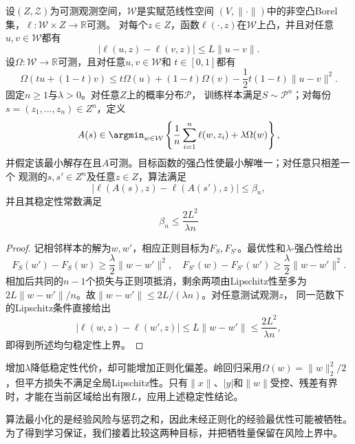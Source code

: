 \begin{theorem}[强凸正则化的稳定性]
\label{thm:regularized-erm-stability}
设$(Z,\mathcal Z)$为可测观测空间，$\mathcal W$是实赋范线性空间
$(V,\|\cdot\|)$中的非空凸Borel集，$\ell:\mathcal W\times Z\to\mathbb R$可测。
对每个$z\in Z$，函数$\ell(\cdot,z)$在$\mathcal W$上凸，并且对任意
$u,v\in\mathcal W$都有
\[
 |\ell(u,z)-\ell(v,z)|\leq L\|u-v\|.
\]
设$\Omega:\mathcal W\to\mathbb R$可测，且对任意$u,v\in\mathcal W$和
$t\in[0,1]$都有
\[
 \Omega(tu+(1-t)v)
 \leq t\Omega(u)+(1-t)\Omega(v)-\frac12t(1-t)\|u-v\|^2.
\]
固定$n\geq1$与$\lambda>0$。对任意$Z$上的概率分布$\mathcal P$，
训练样本满足$S\sim\mathcal P^n$；对每份$s=(z_1,\ldots,z_n)\in Z^n$，定义
\[
 A(s)\in\argmin_{w\in\mathcal W}
 \left\{\frac1n\sum_{i=1}^n\ell(w,z_i)+\lambda\Omega(w)\right\},
\]
并假定该最小解存在且$A$可测。目标函数的强凸性使最小解唯一；对任意只相差一个
观测的$s,s'\in Z^n$及任意$z\in Z$，算法满足
\[
 |\ell(A(s),z)-\ell(A(s'),z)|\leq\beta_n,
\]
并且其稳定性常数满足
\begin{equation}
 \beta_n\leq\frac{2L^2}{\lambda n}
 \label{eq:regularized-stability-bound}
\end{equation}
\end{theorem}

\begin{proof}
记相邻样本的解为$w,w'$，相应正则目标为$F_S,F_{S'}$。最优性和$\lambda$-强凸性给出
\begin{equation*}
 F_S(w')-F_S(w)\geq\frac\lambda2\|w-w'\|^2,
 \quad
 F_{S'}(w)-F_{S'}(w')\geq\frac\lambda2\|w-w'\|^2.
\end{equation*}
相加后共同的$n-1$个损失与正则项抵消，剩余两项由Lipschitz性至多为
$2L\|w-w'\|/n$。故$\|w-w'\|\leq2L/(\lambda n)$。对任意测试观测$z$，
同一范数下的Lipschitz条件直接给出
\[
 |\ell(w,z)-\ell(w',z)|
 \leq L\|w-w'\|
 \leq\frac{2L^2}{\lambda n},
\]
即得到所述均匀稳定性上界。
\end{proof}

增加$\lambda$降低稳定性代价，却可能增加正则化偏差。岭回归采用$\Omega(w)=\|w\|_2^2/2$，但平方损失不满足全局Lipschitz性。只有$\|x\|$、$|y|$和$\|w\|$受控、残差有界时，才能在当前区域给出有限$L$，应用上述稳定性结论。

算法最小化的是经验风险与惩罚之和，因此未经正则化的经验最优性可能被牺牲。为了得到学习保证，我们接着比较这两种目标，并把牺牲量保留在风险上界中。

